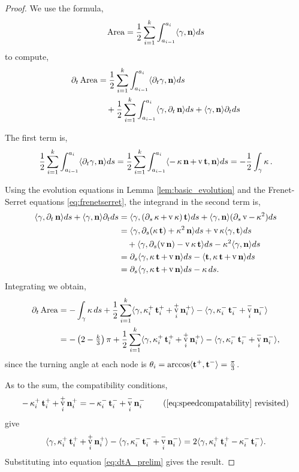 \documentclass[11pt]{amsart}
\DeclareMathOperator{\tangspeed}{v}
\begin{document}
\begin{proof}
We use the formula,
\[
\operatorname{Area} = \frac{1}{2} \sum_{i=1}^k \int_{a_{i-1}}^{a_i} \langle{\gamma},{\operatorname{\mathbf{n}}}\rangle ds
\]
to compute,
\[
\begin{split}
\partial_t \operatorname{Area} &= \frac{1}{2} \sum_{i=1}^k \int_{a_{i-1}}^{a_i} \langle{\partial_t \gamma},{\operatorname{\mathbf{n}}}\rangle ds \\
&\quad + \frac{1}{2} \sum_{i=1}^k \int_{a_{i-1}}^{a_i} \langle{\gamma},{\partial_t \operatorname{\mathbf{n}}}\rangle ds + \langle{\gamma},{\operatorname{\mathbf{n}}}\rangle \partial_t ds
\end{split}
\]

The first term is,
\[
\frac{1}{2} \sum_{i=1}^k \int_{a_{i-1}}^{a_i} \ip{\partial_t \gamma}{\nor} ds = \frac{1}{2} \sum_{i=1}^k \int_{a_{i-1}}^{a_i} \ip{-\curvecurv \nor + \tangspeed \tang}{\nor} ds = -\frac{1}{2} \int_{\gamma} \curvecurv.
\]

Using the evolution equations in Lemma \ref{lem:basic_evolution} and the Frenet-Serret equations \eqref{eq:frenetserret}, the integrand in the second term is,
\[
\begin{split}
\ip{\gamma}{\partial_t \nor} ds + \ip{\gamma}{\nor} \partial_t ds &= \ip{\gamma}{(\partial_s \curvecurv + \tangspeed \curvecurv)\tang} ds + \ip{\gamma}{\nor} (\partial_s \tangspeed - \curvecurv^2) ds \\
&= \ip{\gamma}{\partial_s(\curvecurv\tang) + \curvecurv^2 \nor} ds + \tangspeed\curvecurv \ip{\gamma}{\tang} ds \\
&\quad + \ip{\gamma}{\partial_s (\tangspeed \nor) - \tangspeed \curvecurv \tang} ds - \curvecurv^2 \ip{\gamma}{\nor} ds \\
&= \partial_s \ip{\gamma}{\curvecurv\tang + \tangspeed \nor} ds - \ip{\tang}{\curvecurv \tang + \tangspeed \nor} ds \\
&= \partial_s \ip{\gamma}{\curvecurv\tang + \tangspeed \nor} ds - \curvecurv ds.
\end{split}
\]
Integrating we obtain,
\begin{equation}
\label{eq:dtA_prelim}
\begin{split}
\partial_t \area &= -\int_{\gamma} \curvecurv ds + \frac{1}{2} \sum_{i=1}^k \ip{\gamma}{\curvecurv_i^+ \tang_i^+ + \tangspeed_i^+ \nor_i^+} - \ip{\gamma}{\curvecurv_i^- \tang_i^- + \tangspeed_i^- \nor_i^-} \\
&= - \left(2 - \tfrac{k}{3}\right)\pi + \frac{1}{2} \sum_{i=1}^k \ip{\gamma}{\curvecurv_i^+ \tang_i^+ + \tangspeed_i^+ \nor_i^+} - \ip{\gamma}{\curvecurv_i^- \tang_i^- + \tangspeed_i^- \nor_i^-},
\end{split}
\end{equation}
since the turning angle at each node is \(\theta_i = \arccos \langle{\operatorname{\mathbf{t}}^+},{\operatorname{\mathbf{t}}^-}\rangle = \tfrac{\pi}{3}\).

As to the sum, the compatibility conditions,
\[
-\curvecurv_i^+ \tang_i^+ + \tangspeed_i^+ \nor_i^+ = -\curvecurv_i^- \tang_i^- + \tangspeed_i^- \nor_i^- \tag{\ref{eq:speedcompatability} revisited}
\]
give
\[
\ip{\gamma}{\curvecurv_i^+ \tang_i^+ + \tangspeed_i^+ \nor_i^+} - \ip{\gamma}{\curvecurv_i^- \tang_i^- + \tangspeed_i^- \nor_i^-} = 2\ip{\gamma}{\curvecurv_i^+ \tang_i^+ - \curvecurv_i^- \tang_i^-}.
\]
Substituting into equation \eqref{eq:dtA_prelim} gives the result.
\end{proof}
\end{document}
